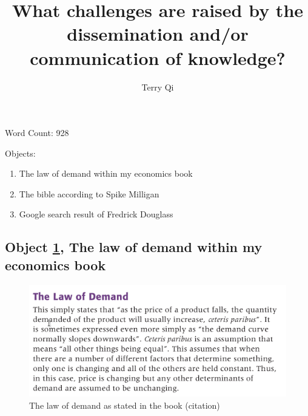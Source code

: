\documentclass[a4paper,11pt]{article}
\title{What challenges are raised by the dissemination and/or communication of knowledge?}
\author{Terry Qi}
\begin{document}
\maketitle

Word Count: 928

Objects:
\begin{enumerate}
 \item The law of demand within my economics book
 \item The bible according to Spike Milligan
 \item Google search result of Fredrick Douglass
\end{enumerate}

\newpage




\subsection*{Object \ref{fig:lod}, The law of demand within my economics book}

\begin{figure}[H]
 \centering
 \includegraphics[scale=0.3]{ecobook.png}
 \caption{The law of demand as stated in the book (citation)}
 \label{fig:lod}
\end{figure}
\end{document}
